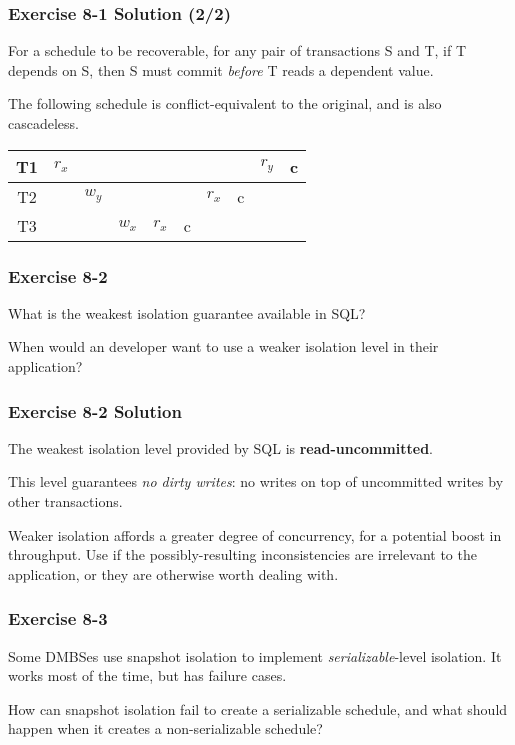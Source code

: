 \begin{frame}
\frametitle{Exercise 8-1 Solution (2/2)}

For a schedule to be recoverable, for any pair of transactions S and T, if T depends on S, then S must commit \textit{before} T reads a dependent value.

The following schedule is conflict-equivalent to the original, and is also cascadeless.

\begin{center}
\begin{tabular}{ c c c c c c c c c c }
  \hline
  T1 & $r_x$ & & & & & & & $r_y$ & c \\
  \hline
  T2 & & $w_y$ & & & & $r_x$ & c & & \\
  \hline
  T3 & & & $w_x$ & $r_x$ & c & & & & \\
  \hline
\end{tabular}
\end{center}

\end{frame}


\begin{frame}
\frametitle{Exercise 8-2}

What is the weakest isolation guarantee available in SQL?

When would an developer want to use a weaker isolation level in their application?

\end{frame}


\begin{frame}
\frametitle{Exercise 8-2 Solution}

The weakest isolation level provided by SQL is \textbf{read-uncommitted}.

This level guarantees \textit{no dirty writes}: no writes on top of uncommitted writes by other transactions.

Weaker isolation affords a greater degree of concurrency, for a potential boost in throughput. Use if the possibly-resulting inconsistencies are irrelevant to the application, or they are otherwise worth dealing with.

\end{frame}


\begin{frame}
\frametitle{Exercise 8-3}

Some DMBSes use snapshot isolation to implement \textit{serializable}-level isolation. It works most of the time, but has failure cases.

How can snapshot isolation fail to create a serializable schedule, and what should happen when it creates a non-serializable schedule?

\end{frame}


